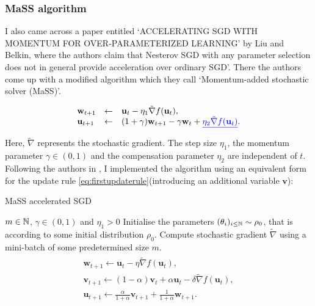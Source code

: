 \documentclass{article}
\begin{document}
\subsubsection{MaSS algorithm}

 I also came across a paper entitled ‘ACCELERATING SGD WITH MOMENTUM FOR OVER-PARAMETERIZED LEARNING’ by Liu and Belkin, where the authors claim that Nesterov SGD with any parameter selection does not in general provide acceleration over ordinary SGD’. There the authors come up with a modified algorithm which they call ‘Momentum-added stochastic solver (MaSS)’. 

 \begin{eqnarray}\left.\begin{array}{lll}
\mathbf{w}_{t+1} &\leftarrow& \mathbf{u}_t - \eta_1 \tilde{\nabla}f(\mathbf{u}_t), \\
\mathbf{u}_{t+1} &\leftarrow& (1+\gamma)\mathbf{w}_{t+1} - \gamma \mathbf{w}_{t} + \underline{\color{blue}  \eta_2 \tilde{\nabla}f(\mathbf{u}_t)}.\end{array}\right.\label{eq:firstupdaterule}
\end{eqnarray}

Here, $\tilde{\nabla}$ represents the stochastic gradient. The step size $\eta_1$, the  momentum parameter $\gamma \in (0,1)$ and the compensation parameter $\eta_2$ are independent of $t$. Following the authors in \cite{liu2019acceleratingsgdmomentumoverparameterized}, I implemented the algorithm using an equivalent form for the update rule \ref{eq:firstupdaterule}(introducing an additional variable $\mathbf{v}$):

\begin{examplesblock}{MaSS accelerated SGD}\label{alg: MaSS sgd}
\begin{algorithmic}
\Require $ m\in \mathbb{N} $, $ \gamma\in (0,1)$ and $ \eta_{1}>0$
\State Initialise the parameters $(\mathbf{\theta}_{i})_{i\leq \mathbb{N}} \sim \rho_{0}$, that is according to some initial distribution $ \rho_{0}$.
\State Compute stochastic gradient $\tilde{\nabla} $ using a mini-batch of some predetermined size $ m$.
\State \begin{eqnarray}\label{eq:newrules}
\begin{array}{l}
\mathbf{w}_{t+1} \leftarrow \mathbf{u}_t - \eta \tilde{\nabla}f(\mathbf{u}_t),\\
\mathbf{v}_{t+1} \leftarrow (1-\alpha)\mathbf{v}_t + \alpha \mathbf{u}_t - \delta \tilde{\nabla}f(\mathbf{u}_t),\label{eq:updateb}\\
\mathbf{u}_{t+1} \leftarrow \frac{\alpha}{1+\alpha}\mathbf{v}_{t+1} + \frac{1}{1+\alpha}\mathbf{w}_{t+1}.\end{array}
\end{eqnarray}
\EndWhile

\end{algorithmic}

\end{examplesblock}
\end{document}
